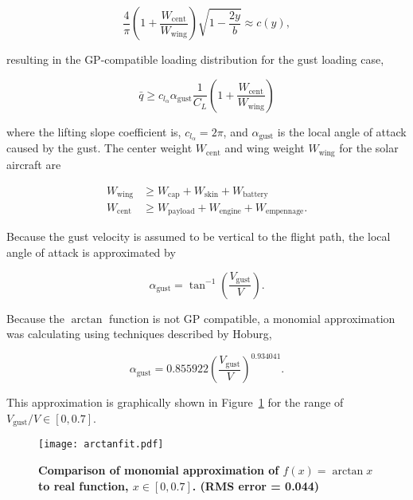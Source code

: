 \documentclass[]{aiaa-tc}%
\begin{document}
\begin{equation}
    \label{e:cancel}
    \frac{4}{\pi}\left( 1 + \frac{W_{\text{cent}}}{W_{\text{wing}}}\right) \sqrt{1-\frac{2y}{b}} \approx c(y),
\end{equation}

resulting in the GP-compatible loading distribution for the gust loading case,

\begin{equation}
    \label{e:gustdist}
    \bar{q} \geq c_{l_{\alpha}} \alpha_{\text{gust}} \frac{1}{C_L} \left( 1 + \frac{W_{\text{cent}}}{W_{\text{wing}}} \right)
\end{equation}

where the lifting slope coefficient is, $c_{l_{\alpha}}=2\pi$, and $\alpha_{\text{gust}}$ is the local angle of attack caused by the gust. The center weight $W_{\text{cent}}$ and wing weight $W_{\text{wing}}$ for the solar aircraft are

\begin{align}
    W_{\text{wing}} &\geq W_{\text{cap}} + W_{\text{skin}} + W_{\text{battery}}\\
    W_{\text{cent}} &\geq W_{\text{payload}} + W_{\text{engine}} + W_{\text{empennage}}.
\end{align}

Because the gust velocity is assumed to be vertical to the flight path, the local angle of attack is approximated by 

\begin{equation}
    \label{e:gustalpha}
    \alpha_{\text{gust}} = \tan^{-1}\left(\frac{V_{\text{gust}}}{V} \right).
\end{equation}

Because the $\arctan$ function is not GP compatible, a monomial approximation was calculating using techniques described by Hoburg\cite{fitting},

\begin{equation}
    \label{e:arctan}
    \alpha_{\text{gust}} = 0.855922 \left(\frac{V_{\text{gust}}}{V} \right)^{0.934041}.
\end{equation}

This approximation is graphically shown in Figure~\ref{f:arctanfit} for the range of $V_{\text{gust}}/V \in [0, 0.7]$.  

\begin{figure}[H]
	\begin{center}
	\texttt{[image: arctanfit.pdf]}
    \caption{ \textbf{ Comparison of monomial approximation of $f(x) = \arctan{x}$ to real function, $x \in [0,0.7]$. (RMS error = 0.044) }}
	\label{f:arctanfit}
	\end{center}
\end{figure}
\end{document}
